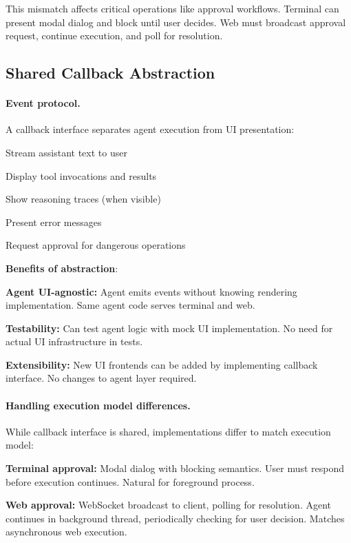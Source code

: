 This mismatch affects critical operations like approval workflows. Terminal can present modal dialog and block until user decides. Web must broadcast approval request, continue execution, and poll for resolution.

\subsection{Shared Callback Abstraction}
\label{sec:uicallback}

\paragraph{Event protocol.} A callback interface separates agent execution from UI presentation:

\begin{packeditemize}
\item Stream assistant text to user
\item Display tool invocations and results
\item Show reasoning traces (when visible)
\item Present error messages
\item Request approval for dangerous operations
\end{packeditemize}

\textbf{Benefits of abstraction}:

\begin{packeditemize}
\item \textbf{Agent UI-agnostic:} Agent emits events without knowing rendering implementation. Same agent code serves terminal and web.
\item \textbf{Testability:} Can test agent logic with mock UI implementation. No need for actual UI infrastructure in tests.
\item \textbf{Extensibility:} New UI frontends can be added by implementing callback interface. No changes to agent layer required.
\end{packeditemize}

\paragraph{Handling execution model differences.} While callback interface is shared, implementations differ to match execution model:

\begin{packeditemize}
\item \textbf{Terminal approval:} Modal dialog with blocking semantics. User must respond before execution continues. Natural for foreground process.
\item \textbf{Web approval:} WebSocket broadcast to client, polling for resolution. Agent continues in background thread, periodically checking for user decision. Matches asynchronous web execution.
\end{packeditemize}

